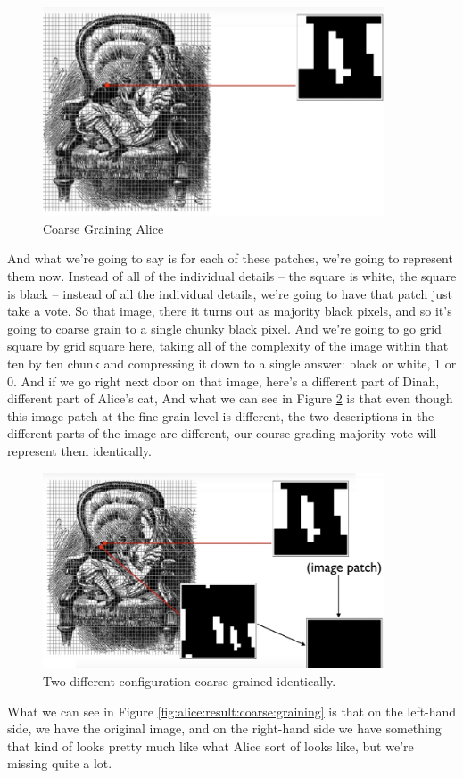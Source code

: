 \documentclass[]{article}
\begin{document}
\begin{figure}[H]
	\caption{Coarse Graining Alice}\label{fig:alice:coarse}
	\includegraphics[width=0.9\textwidth]{Alice2}
\end{figure}
And what we're going to say
is for each of these patches,
we're going to represent them now.
Instead of all of the individual details –
the square is white, the square is black –
instead of all the individual details,
we're going to have that patch
just take a vote.
So that image, there it turns out
as majority black pixels,
and so it's going to coarse grain
to a single chunky black pixel.
And we're going to go
grid square by grid square here,
taking all of the complexity
of the image within that ten by ten chunk
and compressing it down
to a single answer:
black or white, 1 or 0.
And if we go right next door
on that image,
here's a different part of Dinah,
different part of Alice's cat,
And what we can see in Figure \ref{fig:alice:voting}
is that even though this image patch
at the fine grain level is different,
the two descriptions in the different
parts of the image are different,
our course grading majority vote
will represent them identically.

\begin{figure}[H]
	\caption{Two different configuration coarse grained identically.}\label{fig:alice:voting}
	\includegraphics[width=0.9\textwidth]{Alice3}
\end{figure}
What we can see in Figure \ref{fig:alice:result:coarse:graining} is that on the left-hand side, we have the original image, and on the right-hand side
we have something that kind of looks pretty much like what
Alice sort of looks like, but we're missing quite a lot.
\end{document}
